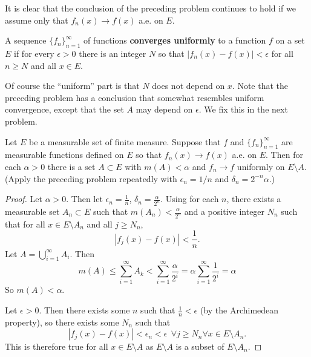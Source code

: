 \begin{rmk}%
	It is clear that the conclusion of the preceding problem continues to hold 
	if we assume only that $f_n(x) \rightarrow f(x)$ a.e. on $E$. 
\end{rmk}

\begin{defn}\label{convergeuniformly}%
	A sequence $\{f_n\}_{n=1}^\infty$ of functions \textbf{converges uniformly} 
	to a function $f$ on a set $E$ if for every $\epsilon > 0$ there is an 
	integer $N$ so that $|f_n(x) - f(x)| < \epsilon$ for all $n \ge N$ and 
	all $x \in E$. 

	Of course the ``uniform'' part is that $N$ does not depend on $x$. Note 
	that the preceding problem has a conclusion that somewhat resembles uniform 
	convergence, except that the set $A$ may depend on $\epsilon$. We fix this 
	in the next problem. 
\end{defn}

\pagebreak
\begin{pblm}\label{p:egoroff}%
	Let $E$ be a measurable set of finite measure. Suppose that $f$ and 
	$\{f_n\}_{n=1}^\infty$ are measurable functions defined on $E$ so that 
	$f_n(x) \rightarrow f(x)$ a.e. on $E$. Then for each $\alpha > 0$ there is 
	a set $A \subset E$ with $m(A) < \alpha$ and $f_n \rightarrow f$ uniformly 
	on $E\setminus A$. \\ (Apply the preceding problem repeatedly with 
	$\epsilon_n = 1/n$ and $\delta_n = 2^{-n}\alpha$.)
\begin{proof}
	Let $\alpha > 0$. Then let $\epsilon_n = \frac{1}{n}$, $\delta_n = \frac{\alpha}{2^n}$. 
	Using  for each $n$, there exists a measurable 
	set $A_n \subset E$ such that $m(A_n) < \frac{\alpha}{2^n}$ and a positive 
	integer $N_n$ such that for all $x \in E\setminus A_n$ and all $j \ge N_n$, 
	\begin{equation*}
		|f_j(x) - f(x)| < \frac{1}{n}. 
	\end{equation*}
	Let $A = \bigcup\limits_{i=1}^\infty A_i$. Then 
	\begin{equation*}
		m(A) \le \sum\limits_{i=1}^\infty A_k < \sum\limits_{i=1}^\infty\frac{\alpha}{2^i} = \alpha \sum\limits_{i=1}^\infty \frac{1}{2^i} = \alpha
	\end{equation*} 
	So $m(A) < \alpha$. 

	Let $\epsilon > 0$. Then there exists some $n$ such that $\frac{1}{n} < \epsilon$ 
	(by the Archimedean property), so there exists some $N_n$ such that 
	\begin{equation*}
		|f_j(x) - f(x)| < \epsilon_n < \epsilon ~~\forall j \ge N_n \forall x \in E\setminus A_n. 
	\end{equation*}
	This is therefore true for all $x \in E\setminus A$ as $E\setminus A$ is a 
	subset of $E \setminus A_n$. 
\end{proof}
\end{pblm}


